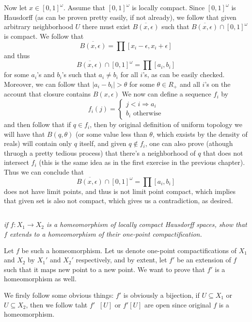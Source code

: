 \documentclass[11pt,oneside,titlepage]{book}
\DeclareMathOperator \inv {^{-1}}
\DeclareMathOperator \ra {\Rightarrow}
\begin{document}
Now let $x \in [0, 1]^\omega$. Assume that $[0, 1]^\omega$ is locally compact.
Since $[0, 1]^\omega$ is Hausdorff (as can be proven pretty easily,
if not already), we follow that given arbitrary neighborhood $U$
there must exist $\overline{B(x, \epsilon)}$ such that
$\overline{B(x, \epsilon)} \cap [0, 1]^\omega$ is compact. We follow that
$$\overline{B(x, \epsilon)} = \prod{[x_i - \epsilon, x_i + \epsilon]}$$
and thus
$$\overline{B(x, \epsilon)} \cap [0, 1]^\omega = \prod{[a_i, b_i]}$$
for some $a_i$'s and $b_i$'s such that $a_i \neq b_i$ for all $i$'s, as can be easily checked.
Moreover, we can follow that $|a_i - b_i| > \theta$ for some $\theta \in R_+$ and all $i$'s
on the account that closure contains $B(x, \epsilon)$
We now can define a sequence $f_i$ by
$$f_i(j) =
\begin{cases}
  j < i \ra a_i \\
  b_i \text{ otherwise}
\end{cases}
$$
and then follow that if $q \in f_i$, then by original definition of uniform topology we will
have that $B(q, \theta)$ (or some value less than $\theta$, which exsists by the density of reals)
will contain only $q$ itself, and given $q \notin f_i$, one can also prove (athough
thruogh a pretty tedious process) that there's a neighborhood of $q$ that does not intersect $f_i$
(this is the same idea as in the first exercise in the previous chapter). Thus we can conclude that
$$\overline{B(x, \epsilon)} \cap [0, 1]^\omega = \prod{[a_i, b_i]}$$
does not have limit points, and thus is not limit point compact, which implies that
given set is also not compact, which gives us a contradiction, as desired.

\subsection{}

\textit{if $f: X_1 \to X_2$ is a homeomorphism of locally compact Hausdorff spaces,
  show that $f$ extends to a homeomorphism of their one-point compactification.}


Let $f$ be such a homeomorphism. Let us denote one-point compactifications of $X_1$ and $X_2$
by $X_1'$ and $X_2'$ respectively, and by extent, let $f'$ be an extension of $f$ such that
it maps new point to a new point. We want to prove that $f'$ is a homeomorphism as well.

We firsly follow some obvious things: $f'$ is obviously a bijection, if $U \subseteq X_1$
or $U \subseteq X_2$, then we follow taht $f'\inv[U]$ or $f'[U]$ are open since original $f$ is
a homeomorphism.
\end{document}
